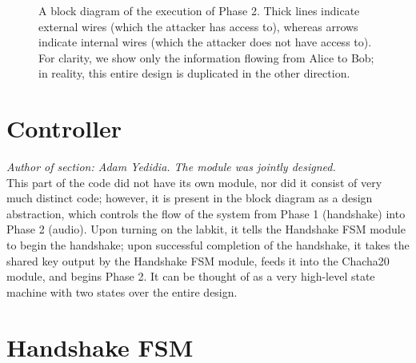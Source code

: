 \documentclass[a4paper]{report}
\begin{document}
\begin{figure}
\label{fig3b}
\centering \caption{A block diagram of the execution of Phase 2. Thick lines indicate external wires (which the attacker has access to), whereas arrows indicate internal wires (which the attacker does not have access to). For clarity, we show only the information flowing from Alice to Bob; in reality, this entire design is duplicated in the other direction.}
%
\end{figure}

\section{Controller}

\emph{Author of section: Adam Yedidia. The module was jointly designed.} \\

This part of the code did not have its own module, nor did it consist of very much distinct code; however, it is present in the block diagram as a design abstraction, which controls the flow of the system from Phase 1 (handshake) into Phase 2 (audio). Upon turning on the labkit, it tells the Handshake FSM module to begin the handshake; upon successful completion of the handshake, it takes the shared key output by the Handshake FSM module, feeds it into the Chacha20 module, and begins Phase 2. It can be thought of as a very high-level state machine with two states over the entire design.

\section{Handshake FSM}
\end{document}
